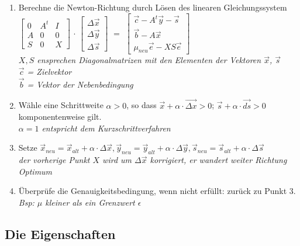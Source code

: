 \begin{enumerate}
\item Berechne die Newton-Richtung durch Lösen des linearen Gleichungssystem\\
$\begin{bmatrix}
0 & A^t & I \\ A & 0 & 0 \\ S & 0 & X \end{bmatrix}$ 
$\cdot$ 
$\begin{bmatrix} \Delta\vec{x}\\\Delta \vec{y}\\\Delta \vec{s} \end{bmatrix}$
 $=$                                                     
$\begin{bmatrix} \vec{c} - A^t \vec{y} - \vec{s} \\ \vec{b}-A\vec{x} \\ \mu_{neu}\vec{e}-XS\vec{e}
\end{bmatrix}$\\
\newline
\textit{$X,S$ ensprechen Diagonalmatrizen mit den Elementen der Vektoren $\vec{x}$, $\vec{s}$}\\
\textit{$\vec{c}$ = Zielvektor}\\
\textit{$\vec{b}$ = Vektor der Nebenbedingung}\\
\item Wähle eine Schrittweite $\alpha > 0$, so dass $\vec{x}+\alpha \cdot \vec{\Delta x} > 0$; $\vec{s}+\alpha \cdot \vec{ds} > 0$ komponentenweise gilt.\\
\textit{$\alpha = 1$ entspricht dem Kurzschrittverfahren}\\
\item Setze $\vec{x}_{neu} = \vec{x}_{alt}+\alpha \cdot \Delta \vec{x}, \vec{y}_{neu} = \vec{y}_{alt}+\alpha \cdot \Delta \vec{y}, \vec{s}_{neu} = \vec{s}_{alt}+\alpha \cdot \Delta \vec{s}$\\
\textit{der vorherige Punkt $X$ wird um $\Delta \vec{x}$ korrigiert, er wandert weiter Richtung Optimum}\\
\item Überprüfe die Genauigkeitsbedingung, wenn nicht erfüllt: zurück zu Punkt 3.\\
\textit{Bsp: $\mu$ kleiner als ein Grenzwert $\epsilon$}
\end{enumerate}



\subsection{Die Eigenschaften}
